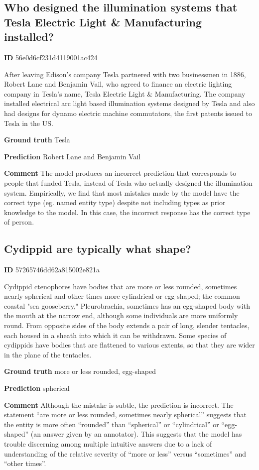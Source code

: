 \documentclass{article} \usepackage{iclr2017_conference,times}
\begin{document}
\subsection*{Who designed the illumination systems that Tesla Electric Light \& Manufacturing installed?}

\textbf{ID} 56e0d6cf231d4119001ac424

After leaving Edison's company Tesla partnered with two businessmen in 1886, Robert Lane and Benjamin Vail, who agreed to finance an electric lighting company in Tesla's name, Tesla Electric Light \& Manufacturing. The company installed electrical arc light based illumination systems designed by Tesla and also had designs for dynamo electric machine commutators, the first patents issued to Tesla in the US.

\textbf{Ground truth}
Tesla

\textbf{Prediction}
Robert Lane and Benjamin Vail

\textbf{Comment}
The model produces an incorrect prediction that corresponds to people that funded Tesla, instead of Tesla who actually designed the illumination system.
Empirically, we find that most mistakes made by the model have the correct type (eg. named entity type) despite not including types as prior knowledge to the model. In this case, the incorrect response has the correct type of person.


\subsection*{Cydippid are typically what shape?}

\textbf{ID} 57265746dd62a815002e821a

Cydippid ctenophores have bodies that are more or less rounded, sometimes nearly spherical and other times more cylindrical or egg-shaped; the common coastal "sea gooseberry," Pleurobrachia, sometimes has an egg-shaped body with the mouth at the narrow end, although some individuals are more uniformly round. From opposite sides of the body extends a pair of long, slender tentacles, each housed in a sheath into which it can be withdrawn. Some species of cydippids have bodies that are flattened to various extents, so that they are wider in the plane of the tentacles.

\textbf{Ground truth}
more or less rounded,
egg-shaped

\textbf{Prediction}
spherical

\textbf{Comment}
Although the mistake is subtle, the prediction is incorrect. The statement ``are more or less rounded, sometimes nearly spherical'' suggests that the entity is more often ``rounded'' than ``spherical'' or ``cylindrical'' or ``egg-shaped'' (an answer given by an annotator).
This suggests that the model has trouble discerning among multiple intuitive answers due to a lack of understanding of the relative severity of ``more or less'' versus ``sometimes'' and ``other times''.


\clearpage{}
\end{document}
